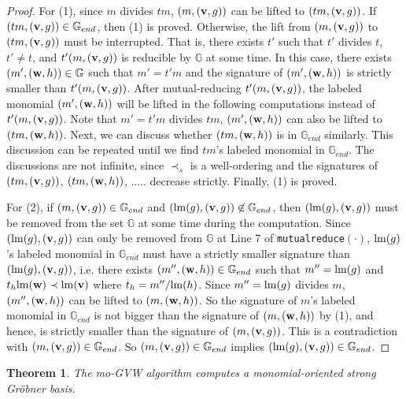 \documentclass[final, number, 3p,12pt]{elsarticle}
\newtheorem{theorem}{Theorem}[section]
\def\G{{\mathbb{G}}}
\def\lm{{\rm lm}} %
\def\v{{\bf v}}
\def\w{{\bf w}}
\begin{document}
\begin{proof}

For (1), since $m$ divides $tm$, $(m, (\v, g))$ can be lifted to $(tm, (\v, g))$. If $(tm, (\v, g)) \in \G_{end}$, then (1) is proved. Otherwise, the lift from $(m, (\v, g))$ to $(tm, (\v, g))$ must be interrupted. That is, there exists $t'$ such that $t'$ divides $t$, $t' \not= t$, and $t'(m, (\v, g))$ is reducible by $\G$ at some time. In this case, there exists $(m', (\w, h)) \in \G$ such that $m' = t'm$ and the signature of $(m', (\w, h))$ is strictly smaller than $t'(m, (\v, g))$. After mutual-reducing $t'(m, (\v, g))$, the labeled monomial $(m', (\w, h))$ will be lifted in the following computations   instead of $t'(m, (\v, g))$. Note that $m' = t'm$ divides $tm$, $(m', (\w, h))$ can also be lifted to $(tm, (\w, h))$. Next, we can discuss whether $(tm, (\w, h))$ is in $\G_{end}$ similarly. This discussion can be repeated until we find $tm$'s labeled monomial in $\G_{end}$. The discussions are not infinite, since $\prec_s$ is a well-ordering and the signatures of $(tm, (\v, g))$, $(tm, (\w, h))$, ..... decrease strictly. Finally, (1) is proved.

For (2), if $(m, (\v, g))\in \G_{end}$ and $(\lm(g), (\v, g)) \not\in \G_{end}$, then $(\lm(g), (\v, g))$ must be removed from the set $\G$ at some time during the computation. Since $(\lm(g), (\v, g))$ can only be removed from $\G$ at Line 7 of {\tt mutualreduce}$(\cdot)$, $\lm(g)$'s labeled monomial in $\G_{end}$ must have a strictly smaller signature than $(\lm(g), (\v, g))$, i.e. there exists $(m'', (\w, h)) \in \G_{end}$ such that $m'' = \lm(g)$ and $t_h\lm(\w) \prec \lm(\v)$ where $t_h = m''/\lm(h)$. Since $m'' = \lm(g)$ divides $m$, $(m'', (\w, h))$ can be lifted to $(m, (\w, h))$. So the signature of $m$'s labeled monomial in $\G_{end}$ is not bigger than the signature of $(m, (\w, h))$ by (1), and hence, is strictly smaller than the signature of $(m, (\v, g))$. This is a contradiction with $(m, (\v, g))\in \G_{end}$. So $(m, (\v, g))\in \G_{end}$ implies $(\lm(g), (\v, g))\in \G_{end}$.
\end{proof}





\begin{theorem} \label{thm_correctness}
The mo-GVW algorithm computes a monomial-oriented strong Gr\"obner basis.
\end{theorem}
\end{document}
